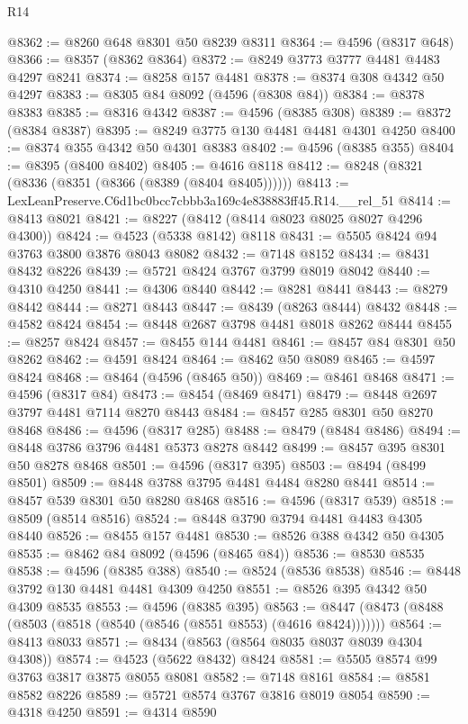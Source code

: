 \begin{lexlean}{R14}
\begin{coremodule}
@8362 := @8260 @648 @8301 @50 @8239 @8311
@8364 := @4596 (@8317 @648)
@8366 := @8357 (@8362 @8364)
@8372 := @8249 @3773 @3777 @4481 @4483 @4297 @8241
@8374 := @8258 @157 @4481
@8378 := @8374 @308 @4342 @50 @4297
@8383 := @8305 @84 @8092 (@4596 (@8308 @84))
@8384 := @8378 @8383
@8385 := @8316 @4342
@8387 := @4596 (@8385 @308)
@8389 := @8372 (@8384 @8387)
@8395 := @8249 @3775 @130 @4481 @4481 @4301 @4250
@8400 := @8374 @355 @4342 @50 @4301 @8383
@8402 := @4596 (@8385 @355)
@8404 := @8395 (@8400 @8402)
@8405 := @4616 @8118
@8412 := @8248 (@8321 (@8336 (@8351 (@8366 (@8389 (@8404 @8405))))))
@8413 := LexLeanPreserve.C6d1bc0bcc7cbbb3a169c4e838883ff45.R14.__rel_51
@8414 := @8413 @8021
@8421 := @8227 (@8412 (@8414 @8023 @8025 @8027 @4296 @4300))
@8424 := @4523 (@5338 @8142) @8118
@8431 := @5505 @8424 @94 @3763 @3800 @3876 @8043 @8082
@8432 := @7148 @8152
@8434 := @8431 @8432 @8226
@8439 := @5721 @8424 @3767 @3799 @8019 @8042
@8440 := @4310 @4250
@8441 := @4306 @8440
@8442 := @8281 @8441
@8443 := @8279 @8442
@8444 := @8271 @8443
@8447 := @8439 (@8263 @8444) @8432
@8448 := @4582 @8424
@8454 := @8448 @2687 @3798 @4481 @8018 @8262 @8444
@8455 := @8257 @8424
@8457 := @8455 @144 @4481
@8461 := @8457 @84 @8301 @50 @8262
@8462 := @4591 @8424
@8464 := @8462 @50 @8089
@8465 := @4597 @8424
@8468 := @8464 (@4596 (@8465 @50))
@8469 := @8461 @8468
@8471 := @4596 (@8317 @84)
@8473 := @8454 (@8469 @8471)
@8479 := @8448 @2697 @3797 @4481 @7114 @8270 @8443
@8484 := @8457 @285 @8301 @50 @8270 @8468
@8486 := @4596 (@8317 @285)
@8488 := @8479 (@8484 @8486)
@8494 := @8448 @3786 @3796 @4481 @5373 @8278 @8442
@8499 := @8457 @395 @8301 @50 @8278 @8468
@8501 := @4596 (@8317 @395)
@8503 := @8494 (@8499 @8501)
@8509 := @8448 @3788 @3795 @4481 @4484 @8280 @8441
@8514 := @8457 @539 @8301 @50 @8280 @8468
@8516 := @4596 (@8317 @539)
@8518 := @8509 (@8514 @8516)
@8524 := @8448 @3790 @3794 @4481 @4483 @4305 @8440
@8526 := @8455 @157 @4481
@8530 := @8526 @388 @4342 @50 @4305
@8535 := @8462 @84 @8092 (@4596 (@8465 @84))
@8536 := @8530 @8535
@8538 := @4596 (@8385 @388)
@8540 := @8524 (@8536 @8538)
@8546 := @8448 @3792 @130 @4481 @4481 @4309 @4250
@8551 := @8526 @395 @4342 @50 @4309 @8535
@8553 := @4596 (@8385 @395)
@8563 := @8447 (@8473 (@8488 (@8503 (@8518 (@8540 (@8546 (@8551 @8553) (@4616 @8424)))))))
@8564 := @8413 @8033
@8571 := @8434 (@8563 (@8564 @8035 @8037 @8039 @4304 @4308))
@8574 := @4523 (@5622 @8432) @8424
@8581 := @5505 @8574 @99 @3763 @3817 @3875 @8055 @8081
@8582 := @7148 @8161
@8584 := @8581 @8582 @8226
@8589 := @5721 @8574 @3767 @3816 @8019 @8054
@8590 := @4318 @4250
@8591 := @4314 @8590

\end{coremodule}
\end{lexlean}
